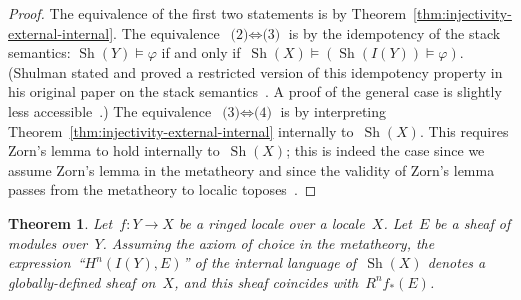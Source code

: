 \documentclass[oneside]{amsart}
\theoremstyle{definition}
\theoremstyle{plain}
\newtheorem{thm}[defn]{Theorem}
\theoremstyle{remark}
\DeclareMathOperator{\Sh}{Sh}
\renewcommand{\_}{\mathpunct{.}\,}
\begin{document}
\begin{proof}The equivalence of the first two statements is by
Theorem~\ref{thm:injectivity-external-internal}. The equivalence~$\text{(2)}
\Leftrightarrow \text{(3)}$ is by the idempotency of the stack semantics:
$\Sh(Y) \models \varphi$ if and only if~$\Sh(X) \models (\Sh(I(Y)) \models
\varphi)$. (Shulman stated and proved a restricted version of this idempotency property
in his original paper on the stack semantics~\cite[Lemma~7.20]{shulman:stack-semantics}.
A proof of the general case is slightly less
accessible~\cite[Lemma~1.20]{blechschmidt:master}.) The equivalence~$\text{(3)}
\Leftrightarrow \text{(4)}$ is by interpreting
Theorem~\ref{thm:injectivity-external-internal} internally to~$\Sh(X)$. This
requires Zorn's lemma to hold internally to~$\Sh(X)$; this is indeed the case
since we assume Zorn's lemma in the metatheory and since the validity of Zorn's
lemma passes from the metatheory to localic
toposes~\cite[Proposition~D4.5.14]{johnstone:elephant}.
\end{proof}

\begin{thm}\label{thm:higher-direct-images-as-internal-sheaf-cohomology}
Let~$f : Y \to X$ be a ringed locale over a locale~$X$. Let~$E$ be a sheaf of modules over~$Y$.
Assuming the axiom of choice in the metatheory, the expression~``$H^n(I(Y), E)$''
of the internal language of~$\Sh(X)$ denotes a globally-defined sheaf
on~$X$, and this sheaf coincides with~$R^n f_*(E)$.\end{thm}
\end{document}

